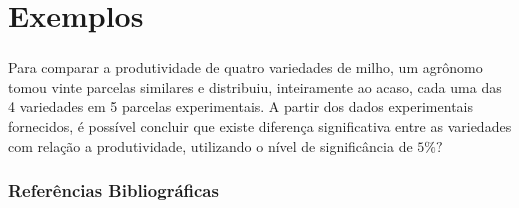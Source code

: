 \documentclass[14pt,aspectratio=1610]{beamer}
\begin{document}
\section{Exemplos}
\begin{frame}{}
\frametitle{}
\begin{block}{}
\justifying
Para comparar a produtividade de quatro variedades de milho, um agrônomo tomou
vinte parcelas similares e distribuiu, inteiramente ao acaso, cada uma das 4 variedades
em 5 parcelas experimentais. A partir dos dados experimentais fornecidos, é possível concluir que existe diferença significativa entre as variedades com relação a 
produtividade, utilizando o nível de significância de $5\%?$
\begin{table}[!h]
\end{table}
\nocite{calegare}
\nocite{ivo}
\end{block}
\end{frame}

\begin{frame}[allowframebreaks]
\frametitle{Referências Bibliográficas}

\end{frame}
\end{document}
